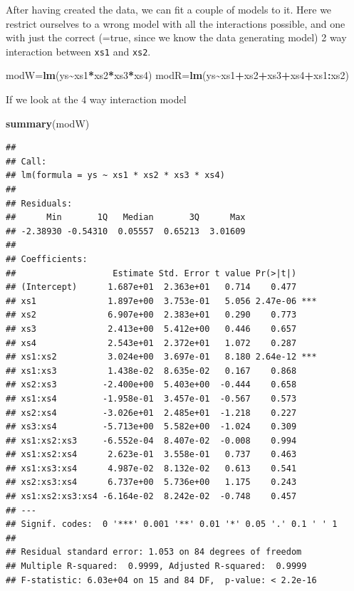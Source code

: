 \documentclass[
]{book}
\newenvironment{Shaded}{\begin{snugshade}}{\end{snugshade}}
\newcommand{\FunctionTok}[1]{\textcolor[rgb]{0.13,0.29,0.53}{\textbf{#1}}}
\newcommand{\NormalTok}[1]{#1}
\newcommand{\OtherTok}[1]{\textcolor[rgb]{0.56,0.35,0.01}{#1}}
\newcommand{\SpecialCharTok}[1]{\textcolor[rgb]{0.81,0.36,0.00}{\textbf{#1}}}
\begin{document}
After having created the data, we can fit a couple of models to it. Here we restrict ourselves to a wrong model with all the interactions possible, and one with just the correct (=true, since we know the data generating model) 2 way interaction between \texttt{xs1} and \texttt{xs2}.

\begin{Shaded}
\begin{Highlighting}[]
\NormalTok{modW}\OtherTok{=}\FunctionTok{lm}\NormalTok{(ys}\SpecialCharTok{\textasciitilde{}}\NormalTok{xs1}\SpecialCharTok{*}\NormalTok{xs2}\SpecialCharTok{*}\NormalTok{xs3}\SpecialCharTok{*}\NormalTok{xs4)}
\NormalTok{modR}\OtherTok{=}\FunctionTok{lm}\NormalTok{(ys}\SpecialCharTok{\textasciitilde{}}\NormalTok{xs1}\SpecialCharTok{+}\NormalTok{xs2}\SpecialCharTok{+}\NormalTok{xs3}\SpecialCharTok{+}\NormalTok{xs4}\SpecialCharTok{+}\NormalTok{xs1}\SpecialCharTok{:}\NormalTok{xs2)}
\end{Highlighting}
\end{Shaded}

If we look at the 4 way interaction model

\begin{Shaded}
\begin{Highlighting}[]
\FunctionTok{summary}\NormalTok{(modW)}
\end{Highlighting}
\end{Shaded}

\begin{verbatim}
## 
## Call:
## lm(formula = ys ~ xs1 * xs2 * xs3 * xs4)
## 
## Residuals:
##      Min       1Q   Median       3Q      Max 
## -2.38930 -0.54310  0.05557  0.65213  3.01609 
## 
## Coefficients:
##                   Estimate Std. Error t value Pr(>|t|)    
## (Intercept)      1.687e+01  2.363e+01   0.714    0.477    
## xs1              1.897e+00  3.753e-01   5.056 2.47e-06 ***
## xs2              6.907e+00  2.383e+01   0.290    0.773    
## xs3              2.413e+00  5.412e+00   0.446    0.657    
## xs4              2.543e+01  2.372e+01   1.072    0.287    
## xs1:xs2          3.024e+00  3.697e-01   8.180 2.64e-12 ***
## xs1:xs3          1.438e-02  8.635e-02   0.167    0.868    
## xs2:xs3         -2.400e+00  5.403e+00  -0.444    0.658    
## xs1:xs4         -1.958e-01  3.457e-01  -0.567    0.573    
## xs2:xs4         -3.026e+01  2.485e+01  -1.218    0.227    
## xs3:xs4         -5.713e+00  5.582e+00  -1.024    0.309    
## xs1:xs2:xs3     -6.552e-04  8.407e-02  -0.008    0.994    
## xs1:xs2:xs4      2.623e-01  3.558e-01   0.737    0.463    
## xs1:xs3:xs4      4.987e-02  8.132e-02   0.613    0.541    
## xs2:xs3:xs4      6.737e+00  5.736e+00   1.175    0.243    
## xs1:xs2:xs3:xs4 -6.164e-02  8.242e-02  -0.748    0.457    
## ---
## Signif. codes:  0 '***' 0.001 '**' 0.01 '*' 0.05 '.' 0.1 ' ' 1
## 
## Residual standard error: 1.053 on 84 degrees of freedom
## Multiple R-squared:  0.9999, Adjusted R-squared:  0.9999 
## F-statistic: 6.03e+04 on 15 and 84 DF,  p-value: < 2.2e-16
\end{verbatim}
\end{document}
